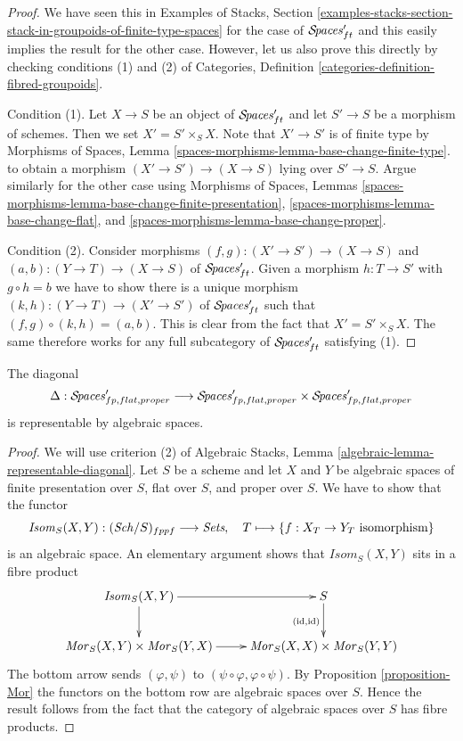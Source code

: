 \begin{proof}
We have seen this in
Examples of Stacks, Section
\ref{examples-stacks-section-stack-in-groupoids-of-finite-type-spaces}
for the case of $\mathcal{S}\!\mathit{paces}'_{ft}$ and this easily implies the
result for the other case. However, let us also prove
this directly by checking conditions (1) and (2) of
Categories, Definition \ref{categories-definition-fibred-groupoids}.

\medskip\noindent
Condition (1). Let $X \to S$ be an object of $\mathcal{S}\!\mathit{paces}'_{ft}$
and let $S' \to S$ be a morphism of schemes. Then we set
$X' = S' \times_S X$. Note that $X' \to S'$ is of finite type
by Morphisms of Spaces, Lemma
\ref{spaces-morphisms-lemma-base-change-finite-type}.
to obtain a morphism $(X' \to S') \to (X \to S)$
lying over $S' \to S$.
Argue similarly for the other case using
Morphisms of Spaces, Lemmas
\ref{spaces-morphisms-lemma-base-change-finite-presentation},
\ref{spaces-morphisms-lemma-base-change-flat}, and
\ref{spaces-morphisms-lemma-base-change-proper}.

\medskip\noindent
Condition (2). Consider morphisms
$(f, g) : (X' \to S') \to (X \to S)$ and $(a, b) : (Y \to T) \to (X \to S)$
of $\mathcal{S}\!\mathit{paces}'_{ft}$. Given a morphism $h : T \to S'$ with
$g \circ h = b$ we have to show
there is a unique morphism $(k, h) : (Y \to T) \to (X' \to S')$ of
$\mathcal{S}\!\mathit{paces}'_{ft}$ such that
$(f, g) \circ (k, h) = (a, b)$.
This is clear from the fact that $X' = S' \times_S X$.
The same therefore works for any full subcategory of
$\mathcal{S}\!\mathit{paces}'_{ft}$ satisfying (1).
\end{proof}

\begin{lemma}
\label{lemma-spaces-diagonal}
The diagonal
$$
\Delta : \mathcal{S}\!\mathit{paces}'_{fp, flat, proper} \longrightarrow
\mathcal{S}\!\mathit{paces}'_{fp, flat, proper} \times \mathcal{S}\!\mathit{paces}'_{fp, flat, proper}
$$
is representable by algebraic spaces.
\end{lemma}

\begin{proof}
We will use criterion (2) of
Algebraic Stacks, Lemma \ref{algebraic-lemma-representable-diagonal}.
Let $S$ be a scheme and let $X$ and $Y$ be algebraic spaces
of finite presentation over $S$, flat over $S$, and proper over $S$.
We have to show that the functor
$$
\mathit{Isom}_S(X, Y) : (\mathit{Sch}/S)_{fppf} \longrightarrow \textit{Sets}, \quad
T \longmapsto \{f : X_T \to Y_T \text{ isomorphism}\}
$$
is an algebraic space. An elementary argument shows that
$\mathit{Isom}_S(X, Y)$ sits in a fibre product
$$
\xymatrix{
\mathit{Isom}_S(X, Y) \ar[r] \ar[d] & S \ar[d]_{(\text{id}, \text{id})} \\
\mathit{Mor}_S(X, Y) \times \mathit{Mor}_S(Y, X) \ar[r] &
\mathit{Mor}_S(X, X) \times \mathit{Mor}_S(Y, Y)
}
$$
The bottom arrow sends $(\varphi, \psi)$ to
$(\psi \circ \varphi, \varphi \circ \psi)$.
By Proposition \ref{proposition-Mor} the functors on the bottom row
are algebraic spaces over $S$. 
Hence the result follows from the fact that the category of
algebraic spaces over $S$ has fibre products.
\end{proof}

